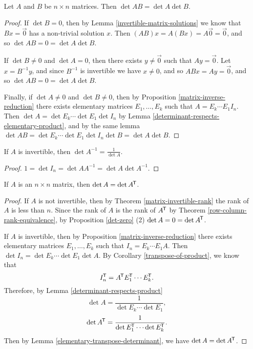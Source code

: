 \begin{thm}\label{determinant-respects-product}
    Let $A$ and $B$ be $n \times n$ matrices. Then $\det AB = \det A \det B$.
\end{thm}

\begin{proof}
    If $\det B = 0$, then by Lemma \ref{invertible-matrix-solutions} we know that $Bx = \vec{0}$ has a non-trivial solution $x$. Then $(AB)x = A(Bx) = A\vec{0} = \vec{0}$, and so $\det AB = 0 = \det A\det B$.

    If $\det B \neq 0$ and $\det A = 0$, then there exists $y \neq \vec{0}$ such that $Ay = \vec{0}$. Let $x = B^{-1}y$, and since $B^{-1}$ is invertible we have $x \neq 0$, and so $ABx = Ay = \vec{0}$, and so $\det AB = 0 = \det A\det B$.

    Finally, if $\det A \neq 0$ and $\det B \neq 0$, then by Proposition \ref{matrix-inverse-reduction} there exists elementary matrices $E_1, \ldots, E_{k}$ such that $A = E_{k}\cdots E_1I_n$. Then $\det A = \det E_{k}\cdots \det E_1\det I_n$ by Lemma \ref{determinant-respects-elementary-product}, and by the same lemma $\det AB = \det E_{k}\cdots \det E_1\det I_n\det B = \det A\det B$.
\end{proof}

\begin{cor}
    If $A$ is invertible, then $\det A^{-1} = \frac{1}{\det A}$.
\end{cor}

\begin{proof}
    $1 = \det I_n = \det AA^{-1} = \det A\det A^{-1}$.
\end{proof}

\begin{thm}
    If $A$ is an $n \times n$ matrix, then $\det A = \det A^{\mkern-1.5mu\mathsf{T}}$.
\end{thm}

\begin{proof}
    If $A$ is not invertible, then by Theorem \ref{matrix-invertible-rank} the rank of $A$ is less than $n$. Since the rank of $A$ is the rank of $A^{\mkern-1.5mu\mathsf{T}}$ by Theorem \ref{row-column-rank-equivalence}, by Proposition \ref{det-zero} (2) $\det A = 0 = \det A^{\mkern-1.5mu\mathsf{T}}$.

    If $A$ is invertible, then by Proposition \ref{matrix-inverse-reduction} there exists elementary matrices $E_1, \ldots, E_{k}$ such that $I_n = E_{k}\cdots E_1A$. Then $\det I_n = \det E_{k}\cdots \det E_1 \det A$. By Corollary \ref{transpose-of-product}, we know that
    \[I_n^{\mkern-1.5mu\mathsf{T}} = A^{\mkern-1.5mu\mathsf{T}}E_1^{\mkern-1.5mu\mathsf{T}}\cdots E_k^{\mkern-1.5mu\mathsf{T}}.\]
    Therefore, by Lemma \ref{determinant-respects-product}
    \[\det A = \frac{1}{\det E_k\cdots \det E_1},\]
    \[\det A^{\mkern-1.5mu\mathsf{T}} = \frac{1}{\det E_1^{\mkern-1.5mu\mathsf{T}}\cdots \det E_k^{\mkern-1.5mu\mathsf{T}}}.\]
    Then by Lemma \ref{elementary-transpose-determinant}, we have $\det A = \det A^{\mkern-1.5mu\mathsf{T}}$.
\end{proof}


